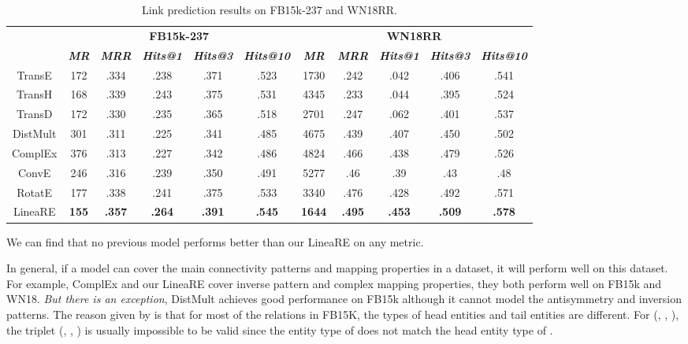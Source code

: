 \documentclass[conference]{IEEEtran}
\begin{document}
\begin{table*}[t]
	\caption{
		Link prediction results on FB15k-237 and WN18RR.
	}
	\label{FB15k-237WN18RR}
	\begin{center}
		\begin{tabular}{|c||c|c|c|c|c||c|c|c|c|c|}
			\hline
			\multirow{2}{*}{}
			& \multicolumn{5}{c||}{\textbf{FB15k-237}}
			& \multicolumn{5}{c|}{\textbf{WN18RR}}   \\
			\cline{2-6} \cline{7-11}
			& \textbf{\textit{MR}}  & \textbf{\textit{MRR}}	 & \textbf{\textit{Hits@1}}  & \textbf{\textit{Hits@3}}  & \textbf{\textit{Hits@10}}
			& \textbf{\textit{MR}}  & \textbf{\textit{MRR}}  & \textbf{\textit{Hits@1}}  & \textbf{\textit{Hits@3}}  & \textbf{\textit{Hits@10}} \\
			\hline
			TransE \cite{TransE}
			& 172	& .334	& .238	& .371	& .523
			& 1730	& .242	& .042	& .406	& .541  \\
			TransH \cite{TransH}
			& 168	& .339	& .243	& .375	& .531
			& 4345	& .233	& .044	& .395	& .524  \\
			TransD \cite{TransD}
			& 172	& .330	& .235	& .365	& .518
			& 2701	& .247	& .062	& .401	& .537  \\
			DistMult \cite{DistMult}
			& 301	& .311	& .225	& .341	& .485
			& 4675	& .439	& .407	& .450	& .502  \\
			ComplEx \cite{ComplEx}
			& 376	& .313	& .227	& .342	& .486
			& 4824	& .466	& .438	& .479	& .526  \\
			ConvE \cite{ConvE}
			& 246	& .316	& .239	& .350	& .491
			& 5277	& .46	& .39	& .43	& .48  \\
			RotatE \cite{RotatE}
			& 177	& .338	& .241	& .375	& .533
			& 3340	& .476	& .428	& .492	& .571  \\
			\hline
			LineaRE
			& \textbf{155}	& \textbf{.357}	& \textbf{.264}	& \textbf{.391}	& \textbf{.545}
			& \textbf{1644}	& \textbf{.495}	& \textbf{.453}	& \textbf{.509}	& \textbf{.578}  \\
			\hline
		\end{tabular}
	\end{center}
\end{table*}
We can find that no previous model performs better than our LineaRE on any metric.

In general, if a model can cover the main connectivity patterns and mapping properties in a dataset, it will perform well on this dataset. For example, ComplEx and our LineaRE cover inverse pattern and complex mapping properties, they both perform well on FB15k and WN18.
\textit{But there is an exception}, DistMult achieves good performance on FB15k although it cannot model the antisymmetry and inversion patterns. The reason given by \cite{RotatE} is that for most of the relations in FB15K, the types of head entities and tail entities are different. For (, , ), the triplet (, , ) is usually impossible to be valid since the entity type of  does not match the head entity type of .
\end{document}
